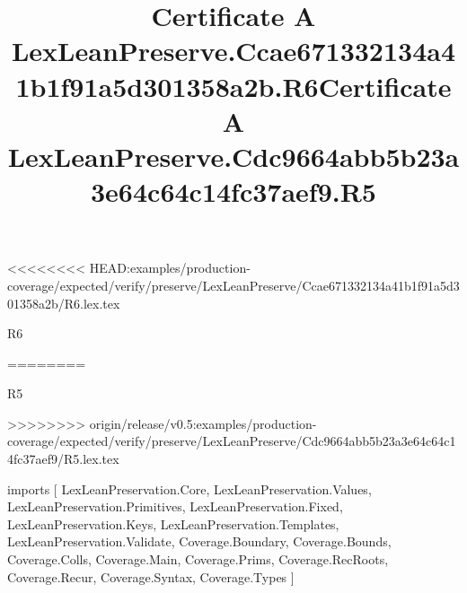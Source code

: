 <<<<<<<< HEAD:examples/production-coverage/expected/verify/preserve/LexLeanPreserve/Ccae671332134a41b1f91a5d301358a2b/R6.lex.tex
\begin{lexlean}{R6}
\title{Certificate A LexLeanPreserve.Ccae671332134a41b1f91a5d301358a2b.R6}
========
\begin{lexlean}{R5}
\title{Certificate A LexLeanPreserve.Cdc9664abb5b23a3e64c64c14fc37aef9.R5}
>>>>>>>> origin/release/v0.5:examples/production-coverage/expected/verify/preserve/LexLeanPreserve/Cdc9664abb5b23a3e64c64c14fc37aef9/R5.lex.tex
\begin{coremodule}
imports [
  LexLeanPreservation.Core,
  LexLeanPreservation.Values,
  LexLeanPreservation.Primitives,
  LexLeanPreservation.Fixed,
  LexLeanPreservation.Keys,
  LexLeanPreservation.Templates,
  LexLeanPreservation.Validate,
  Coverage.Boundary,
  Coverage.Bounds,
  Coverage.Colls,
  Coverage.Main,
  Coverage.Prims,
  Coverage.RecRoots,
  Coverage.Recur,
  Coverage.Syntax,
  Coverage.Types
]


\end{coremodule}
\end{lexlean}
\end{lexlean}
